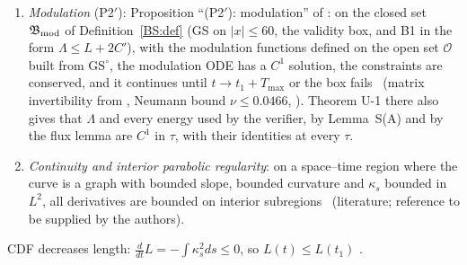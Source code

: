 \documentclass[11pt]{article}
\begin{document}
\begin{enumerate}[label=(P\arabic*$'$),leftmargin=3em]
\begin{itemize}[leftmargin=*]
  \end{itemize}
\item \emph{Modulation} (P2$'$): Proposition ``(P2$'$): modulation'' of : on the closed set $\mathfrak B_{\rm mod}$ of Definition~\ref{BS:def} (GS on $|x|\le60$, the validity box, and B1 in the form $\Lambda\le L+2C'$), with the modulation functions defined on the open set $\mathcal O$ built from $\mathrm{GS}^\circ$, the modulation ODE has a $C^1$ solution, the constraints are conserved, and it continues until $t\to t_1+T_{\max}$ or the box fails \tH\ (matrix invertibility from , Neumann bound $\nu\le0.0466$, \tR). Theorem U-1 there also gives that $\Lambda$ and every energy used by the verifier, by Lemma~S(A) and by the flux lemma are $C^1$ in $\tau$, with their identities at every $\tau$.
\item \emph{Continuity and interior parabolic regularity}: on a space--time region where the curve is a graph with bounded slope, bounded curvature and $\kappa_s$ bounded in $L^2$, all derivatives are bounded on interior subregions \tH\ (literature; reference to be supplied by the authors).
\end{enumerate}
CDF decreases length: $\frac{d}{dt}L=-\int\kappa_s^2ds\le0$, so $L(t)\le L(t_1)$ \tP.
\end{document}
